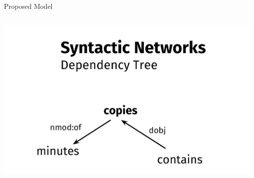 \documentclass[10pt,xcolor=table]{beamer}
\begin{document}
\begin{frame}{Proposed Model}
\begin{columns}
\begin{minipage}[c][0.4\textheight][c]{\linewidth}
			 \centering
				 \includegraphics[width=1\linewidth]{image2/Chapitre2/deps_network_ex.pdf}
		\end{minipage}
	\end{columns}
	


\end{frame}
\end{document}
